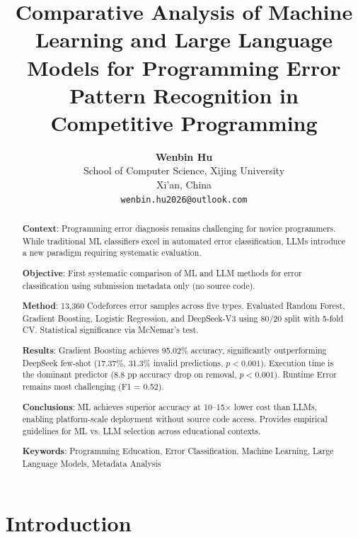 \documentclass[10pt,letterpaper]{article}
\title{\Large\bfseries Comparative Analysis of Machine Learning and Large Language Models for Programming Error Pattern Recognition in Competitive Programming}
\author{
    \textbf{Wenbin Hu}\\
    School of Computer Science, Xijing University\\
    Xi'an, China\\
    \texttt{wenbin.hu2026@outlook.com}
}
\date{}
\begin{document}
\maketitle

\begin{abstract}
\noindent\textbf{Context}: Programming error diagnosis remains challenging for novice programmers. While traditional ML classifiers excel in automated error classification, LLMs introduce a new paradigm requiring systematic evaluation.

\noindent\textbf{Objective}: First systematic comparison of ML and LLM methods for error classification using submission metadata only (no source code).

\noindent\textbf{Method}: 13,360 Codeforces error samples across five types. Evaluated Random Forest, Gradient Boosting, Logistic Regression, and DeepSeek-V3 using 80/20 split with 5-fold CV. Statistical significance via McNemar's test.

\noindent\textbf{Results}: Gradient Boosting achieves 95.02\% accuracy, significantly outperforming DeepSeek few-shot (17.37\%, 31.3\% invalid predictions, $p < 0.001$). Execution time is the dominant predictor (8.8 pp accuracy drop on removal, $p < 0.001$). Runtime Error remains most challenging (F1 = 0.52).

\noindent\textbf{Conclusions}: ML achieves superior accuracy at 10--15$\times$ lower cost than LLMs, enabling platform-scale deployment without source code access. Provides empirical guidelines for ML vs. LLM selection across educational contexts.

\vspace{0.5em}
\noindent\textbf{Keywords}: Programming Education, Error Classification, Machine Learning, Large Language Models, Metadata Analysis
\end{abstract}


\section{Introduction}
\end{document}
